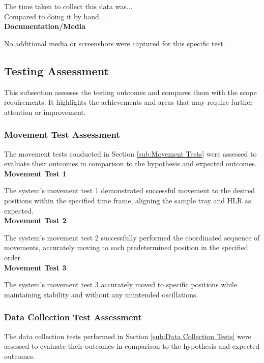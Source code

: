 \documentclass{UoNMCHA}
\numberwithin{equation}{section}
\begin{document}
The time taken to collect this data was...\\

Compared to doing it by hand...\\
\textbf{Documentation/Media}

No additional media or screenshots were captured for this specific test.\\

\subsection{Testing Assessment}\label{sub:Testing Assessment}
This subsection assesses the testing outcomes and compares them with the scope requirements. It highlights the achievements and areas that may require further attention or improvement.\\

\subsubsection{Movement Test Assessment}\label{subsub:Movement Test Assessment}
The movement tests conducted in Section \ref{sub:Movement Tests} were assessed to evaluate their outcomes in comparison to the hypothesis and expected outcomes.\\

\textbf{Movement Test 1}

The system's movement test 1 demonstrated successful movement to the desired positions within the specified time frame, aligning the sample tray and HLR as expected.\\

\textbf{Movement Test 2}

The system's movement test 2 successfully performed the coordinated sequence of movements, accurately moving to each predetermined position in the specified order.\\

\textbf{Movement Test 3}

The system's movement test 3 accurately moved to specific positions while maintaining stability and without any unintended oscillations.\\

\subsubsection{Data Collection Test Assessment}\label{subsub:Data Collection Test Assessment}
The data collection tests performed in Section \ref{sub:Data Collection Tests} were assessed to evaluate their outcomes in comparison to the hypothesis and expected outcomes.\\
\end{document}
